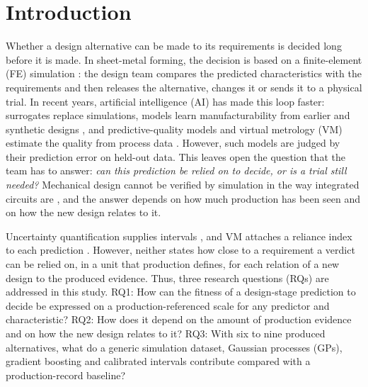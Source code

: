 \documentclass[pdflatex,sn-basic,lineno]{sn-jnl}
\begin{document}
\maketitle

\section{Introduction}\label{sec:intro}

Whether a design alternative can be made to its requirements is decided long before it is made. In sheet-metal forming, the decision is based on a finite-element (FE) simulation \citep{banabic2010sheet}: the design team compares the predicted characteristics with the requirements and then releases the alternative, changes it or sends it to a physical trial. In recent years, artificial intelligence (AI) has made this loop faster: surrogates replace simulations, models learn manufacturability from earlier and synthetic designs \citep{yan2026machine, ghadai2018learning, ballegeer2026bendfm}, and predictive-quality models and virtual metrology (VM) estimate the quality from process data \citep{tercan2022machine, dreyfus2022virtual}. However, such models are judged by their prediction error on held-out data. This leaves open the question that the team has to answer: \emph{can this prediction be relied on to decide, or is a trial still needed?} Mechanical design cannot be verified by simulation in the way integrated circuits are \citep{whitney1996why}, and the answer depends on how much production has been seen and on how the new design relates to it.

Uncertainty quantification supplies intervals \citep{nemani2023uncertainty}, and VM attaches a reliance index to each prediction \citep{cheng2008evaluating}. However, neither states how close to a requirement a verdict can be relied on, in a unit that production defines, for each relation of a new design to the produced evidence. Thus, three research questions (RQs) are addressed in this study. RQ1: How can the fitness of a design-stage prediction to decide be expressed on a production-referenced scale for any predictor and characteristic? RQ2: How does it depend on the amount of production evidence and on how the new design relates to it? RQ3: With six to nine produced alternatives, what do a generic simulation dataset, Gaussian processes (GPs), gradient boosting and calibrated intervals contribute compared with a production-record baseline?
\end{document}
